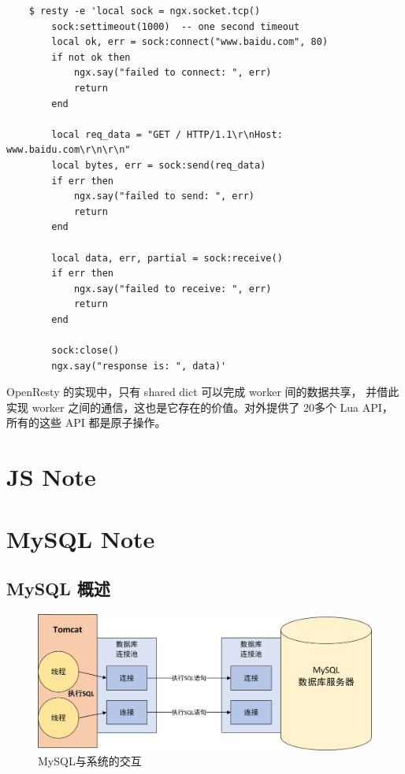 \documentclass[a4,10pt]{ctexart}
\begin{document}
\begin{verbatim}
	$ resty -e 'local sock = ngx.socket.tcp()
        sock:settimeout(1000)  -- one second timeout
        local ok, err = sock:connect("www.baidu.com", 80)
        if not ok then
            ngx.say("failed to connect: ", err)
            return
        end

        local req_data = "GET / HTTP/1.1\r\nHost: www.baidu.com\r\n\r\n"
        local bytes, err = sock:send(req_data)
        if err then
            ngx.say("failed to send: ", err)
            return
        end

        local data, err, partial = sock:receive()
        if err then
            ngx.say("failed to receive: ", err)
            return
        end

        sock:close()
        ngx.say("response is: ", data)'
\end{verbatim}





OpenResty 的实现中，只有 shared dict 可以完成 worker 间的数据共享，
并借此实现 worker 之间的通信，这也是它存在的价值。对外提供了 20多个 Lua API，
所有的这些 API 都是原子操作。








\section{JS Note}

\section{MySQL Note}

\subsection{MySQL 概述}

\begin{figure}[htbp]
	\centering
	\includegraphics[width=.6\textwidth]{img/mysql/1/dbConnect.png}
	\caption{MySQL与系统的交互}
	\label{key1}
\end{figure}
\end{document}
